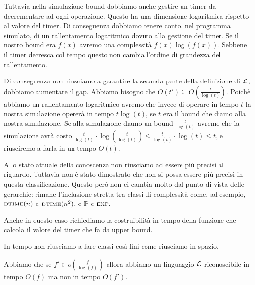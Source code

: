 Tuttavia nella simulazione bound dobbiamo anche gestire un timer da decrementare ad ogni operazione.
Questo ha una dimensione logaritmica rispetto al valore del timer. Di conseguenza dobbiamo tenere
conto, nel programma simulato, di un rallentamento logaritmico dovuto alla gestione del timer. Se il
nostro bound era $f(x)$ avremo una complessità $f(x)\log(f(x))$. Sebbene il timer decresca col
tempo questo non cambia l'ordine di grandezza del rallentamento.

Di conseguenza non riusciamo a garantire la seconda parte della definizione di $\mathcal{L}$, dobbiamo
aumentare il gap. Abbiamo bisogno che $O(t') \subseteq
O\left(\displaystyle\frac{t}{\log(t)}\right)$. Poichè abbiamo un rallentamento logaritmico avremo
che invece di operare in tempo $t$ la nostra simulazione opererà in tempo $t\log(t)$, se $t$ era il
bound che diamo alla nostra simulazione. Se alla simulazione diamo un bound
$\displaystyle\frac{t}{\log(t)}$ avremo che la simulazione avrà costo
$\displaystyle\frac{t}{\log(t)}\cdot \log\left(\displaystyle\frac{t}{\log(t)}\right) \leq
\displaystyle\frac{t}{\log(t)}\cdot \log(t) \leq t$, e riusciremo a farla in un tempo $O(t)$.


Allo stato attuale della conoscenza non riusciamo ad essere più precisi al riguardo. Tuttavia non
è stato dimostrato che non si possa essere più precisi in questa classificazione. Questo però
non ci cambia molto dal punto di vista delle gerarchie: rimane l'inclusione stretta tra classi di
complessità come, ad esempio, $\textsc{dtime}(n)$ e $\textsc{dtime}(n^{2})$, e $\mathbb{P}$ e $\textsc{exp}$.

Anche in questo caso richiediamo la costruibilità in tempo della funzione che calcola il valore del
timer che fa da upper bound.

In tempo non riusciamo a fare classi così fini come riusciamo in spazio.

Abbiamo che se $f' \in o\left(\displaystyle\frac{f}{\log(f)}\right)$ allora abbiamo un linguaggio $\mathcal{L}$ riconoscibile in
tempo $O(f)$ ma non in tempo $O(f')$.

